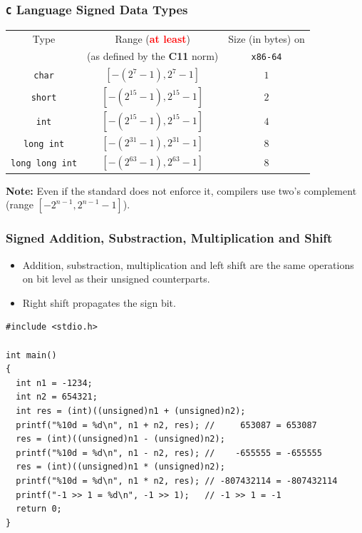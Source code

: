 \documentclass{beamer}
\begin{document}
\begin{frame}%
\frametitle{\texttt{C} Language Signed Data Types}

\scriptsize

\begin{center}
\begin{tabular}{|c|c|c|}
    \hline
    Type & Range (\textcolor{red}{\textbf{at least}}) & Size (in bytes) on \\
    & (as defined by the \textbf{C11} norm) & \texttt{x86-64}\\
    \hline
    \hline
    \lstinline{char} & $[-(2^7 - 1), 2^7 - 1]$ & $1$\bigstrut\\
    \hline
    \lstinline{short} & $[-(2^{15} - 1), 2^{15} - 1]$ & $2$\bigstrut\\
    \hline
    \lstinline{int} & $[-(2^{15} - 1), 2^{15} - 1]$ & $4$\bigstrut\\
    \hline
    \lstinline{long int} & $[-(2^{31} - 1), 2^{31} - 1]$ & $8$\bigstrut\\
    \hline
    \lstinline{long long int} & $[-(2^{63} - 1), 2^{63} - 1]$ & $8$\bigstrut\\
    \hline
  \end{tabular}
\end{center}

\textbf{Note:} Even if the standard does not enforce it, compilers use two's complement (range $[-2^{n-1}, 2^{n - 1} - 1]$).

\end{frame}

\begin{frame}[fragile]
\frametitle{Signed Addition, Substraction, Multiplication and Shift}

\scriptsize

\begin{itemize}

\item Addition, substraction, multiplication and left shift are the same
operations on bit level as their unsigned counterparts.

\vspace{0.2cm}

\item Right shift propagates the sign bit.

\end{itemize}

\begin{lstlisting}
#include <stdio.h>

int main()
{
  int n1 = -1234;
  int n2 = 654321;
  int res = (int)((unsigned)n1 + (unsigned)n2);
  printf("%10d = %d\n", n1 + n2, res); //     653087 = 653087
  res = (int)((unsigned)n1 - (unsigned)n2);
  printf("%10d = %d\n", n1 - n2, res); //    -655555 = -655555
  res = (int)((unsigned)n1 * (unsigned)n2);
  printf("%10d = %d\n", n1 * n2, res); // -807432114 = -807432114
  printf("-1 >> 1 = %d\n", -1 >> 1);   // -1 >> 1 = -1
  return 0;
}
\end{lstlisting}

\end{frame}
\end{document}
